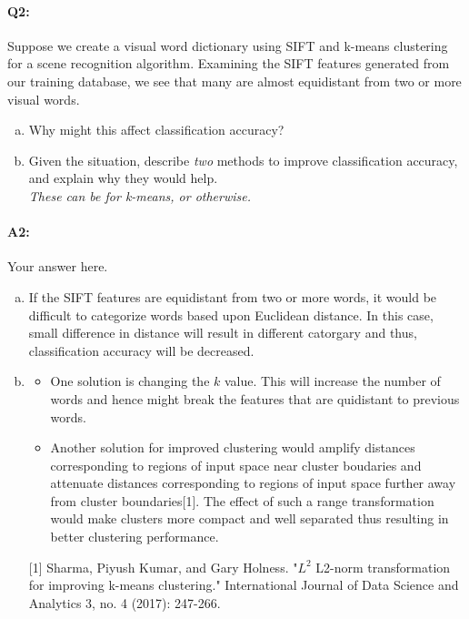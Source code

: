 
\pagebreak
\paragraph{Q2:} Suppose we create a visual word dictionary using SIFT and k-means clustering for a scene recognition algorithm. Examining the SIFT features generated from our training database, we see that many are almost equidistant from two or more visual words.
\begin{enumerate}[(a)]
    \item
          Why might this affect classification accuracy?

    \item
          Given the situation, describe \emph{two} methods to improve classification accuracy, and explain why they would help.\\
          \emph{These can be for k-means, or otherwise.}

\end{enumerate}


\paragraph{A2:} Your answer here.

\begin{enumerate}[(a)]

    \item If the SIFT features are equidistant from two or more words, it would be difficult to categorize words based upon Euclidean distance. In this case, small difference in distance will result in different catorgary and thus, classification accuracy will be decreased.

    \item \begin{itemize}
              \item One solution is changing the $k$ value. This will increase the number of words and hence might break the features that are quidistant to previous words.
              \item Another solution for improved clustering would amplify distances corresponding to regions of input space near cluster boudaries and attenuate distances corresponding to regions of input space further away from cluster boundaries[1]. The effect of such a range transformation would make clusters more compact and well separated thus resulting in better clustering performance.
          \end{itemize}

          [1] Sharma, Piyush Kumar, and Gary Holness. "$L^{2} $ L2-norm transformation for improving k-means clustering." International Journal of Data Science and Analytics 3, no. 4 (2017): 247-266.


\end{enumerate}




